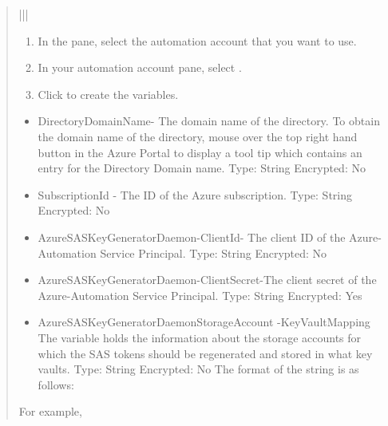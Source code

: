 \documentclass[letterpaper,10pt,english]{sphinxmanual}
\begin{document}
\begin{quote}
\begin{savenotes}
\begin{tabular}[t]{|*{2}{|}}
\begin{enumerate}
\item {} 
In the   pane, select
the automation account that you want to use.

\item {} 
In your automation account pane, select .

\item {} 
Click  to create the variables.

\end{enumerate}
\begin{itemize}
\item {} 
DirectoryDomainName- The domain name of the directory.
To obtain the domain name of the directory, mouse over
the top right hand button in the Azure Portal to display
a tool tip which contains an entry for the Directory
Domain name.
Type: String
Encrypted: No

\item {} 
SubscriptionId - The ID of the Azure subscription.
Type: String
Encrypted: No

\item {} 
AzureSASKeyGeneratorDaemon-ClientId- The client ID of
the Azure-Automation Service Principal.
Type: String
Encrypted: No

\item {} 
AzureSASKeyGeneratorDaemon-ClientSecret-The client
secret of the Azure-Automation Service Principal.
Type: String
Encrypted: Yes

\item {} 
AzureSASKeyGeneratorDaemonStorageAccount
-KeyVaultMapping
The variable holds the information about the storage
accounts for which the SAS tokens should be
regenerated and stored in what key vaults.
Type: String
Encrypted: No
The format of the string is as follows:

\end{itemize}
\begin{description}
\item[{For example,}] \leavevmode
{}


\end{description}
\end{tabular}
\end{savenotes}
\end{quote}
\end{document}
